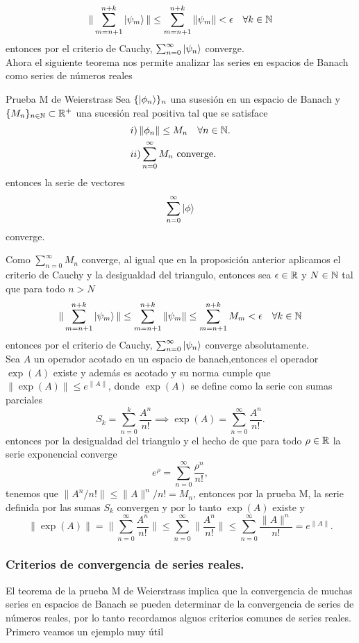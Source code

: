 \documentclass[main.tex]{subfiles}
\begin{document}
\[
 \|\sum_{m=n+1}^{n+k}\ket{\psi_m}\|\leq \sum_{m=n+1}^{n+k}\|\psi_m\|<\epsilon\quad\forall k\in \mathbb N 
\]
entonces por el criterio de Cauchy, \(\sum_{n=0}^{\infty}\ket{\psi_n}\) converge.
\QED\\
Ahora el siguiente teorema nos permite analizar las series en espacios de Banach como series de números reales
\begin{teorema}{Prueba M de Weierstrass}
  Sea \(\{\ket{\phi_n}\}_n\) una susesión en un espacio de Banach y \(\{M_n\}_{n\in \mathbb N }\subset\mathbb R ^{+}\) una sucesión real positiva tal que se satisface
  \begin{align*}
    &i)\,\|\phi_n\|\leq M_n \quad\forall n\in \mathbb N .\\
    &ii)\sum_{n=0}^{\infty}M_n\text{ converge}.
    \end{align*}
  entonces la serie de vectores
  \[
    \sum_{n=0}^{\infty}\ket{\phi}
  \]
  converge.
\end{teorema}
\dem Como \(\sum_{n=0}^{\infty}M_n\) converge, al igual que en la proposición anterior aplicamos el criterio de Cauchy y la desigualdad del triangulo, entonces sea \(\epsilon\in\mathbb R \) y \(N\in \mathbb N \) tal que para todo \(n>N\)
\[
 \|\sum_{m=n+1}^{n+k}\ket{\psi_m}\|\leq \sum_{m=n+1}^{n+k}\|\psi_m\|\leq \sum_{m=n+1}^{n+k}M_m<\epsilon\quad\forall k\in \mathbb N 
\]
entonces por el criterio de Cauchy, \(\sum_{n=0}^{\infty}\ket{\psi_n}\) converge absolutamente.
\QED\\
\eje Sea \(A\) un operador acotado en un espacio de banach,entonces el operador \(\exp(A)\) existe y además es acotado y su norma cumple que \(\|\exp(A)\|\leq e^{\|A\|}\), donde \(\exp(A)\) se define como la serie con sumas parciales
\[
S_k=\sum_{n=0}^{k}\frac{A^n}{n!}\implies\exp(A)=\sum_{n=0}^{\infty}\frac{A^n}{n!}.
\]
entonces por la desigualdad del triangulo y el hecho de que para todo \(\rho\in\mathbb R \) la serie exponencial converge
\[
e^{\rho}=\sum_{n=0}^{\infty}\frac{\rho^n}{n!},
\]
tenemos que \(\|A^n/n!\|\leq\|A\|^n/n!=M_n\), entonces por la prueba M, la serie definida por las sumas \(S_k\) convergen y por lo tanto \(\exp(A)\) existe y
\[
\|\exp(A)\|=\Big\|\sum_{n=0}^{\infty}\frac{A^n}{n!}\Big\|\leq\sum_{n=0}^{\infty}\Big\|\frac{A^n}{n!}\Big\|\leq\sum_{n=0}^{\infty}\frac{\|A\|^n}{n!}=e^{\|A\|}.
\]

\subsubsection{Criterios de convergencia de series reales.}
\noindent El teorema de la prueba M de Weierstrass implica que la convergencia de muchas series en espacios de Banach se pueden determinar de la convergencia de series de números reales, por lo tanto recordamos alguos criterios comunes de series reales. Primero veamos un ejemplo muy útil
\end{document}
